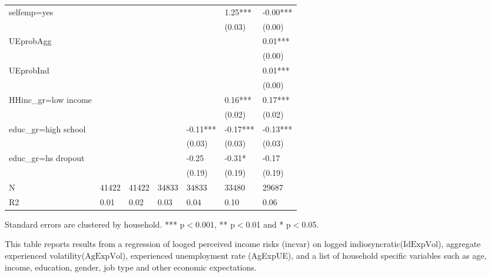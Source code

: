 \begin{table}[p]
\begin{adjustbox}{width=\textwidth}
\begin{threeparttable}
\begin{tabular}{lllllll}
selfemp=yes         &           &           &            &             &      1.25*** &      -0.00*** \\
                    &           &           &            &             &       (0.03) &        (0.00) \\
UEprobAgg           &           &           &            &             &              &       0.01*** \\
                    &           &           &            &             &              &        (0.00) \\
UEprobInd           &           &           &            &             &              &       0.01*** \\
                    &           &           &            &             &              &        (0.00) \\
HHinc\_gr=low income &           &           &            &             &      0.16*** &       0.17*** \\
                    &           &           &            &             &       (0.02) &        (0.02) \\
educ\_gr=high school &           &           &            &    -0.11*** &     -0.17*** &      -0.13*** \\
                    &           &           &            &      (0.03) &       (0.03) &        (0.03) \\
educ\_gr=hs dropout  &           &           &            &       -0.25 &       -0.31* &         -0.17 \\
                    &           &           &            &      (0.19) &       (0.19) &        (0.19) \\
N                   &     41422 &     41422 &      34833 &       34833 &        33480 &         29687 \\
R2                  &      0.01 &      0.02 &       0.03 &        0.04 &         0.10 &          0.06 \\
\bottomrule
\end{tabular}
\begin{tablenotes}\item Standard errors are clustered by household. *** p$<$0.001, ** p$<$0.01 and * p$<$0.05. 
\item This table reports results from a regression of looged perceived income risks (incvar) on logged indiosyncratic($\text{IdExpVol}$), aggregate experienced volatility($\text{AgExpVol}$), experienced unemployment rate (AgExpUE), and a list of household specific variables such as age, income, education, gender, job type and other economic expectations.
\end{tablenotes}
\end{threeparttable}
\end{adjustbox}
\end{table}
\clearpage

